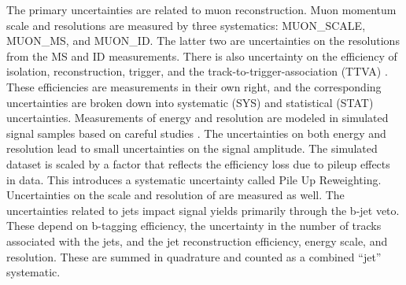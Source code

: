 The primary uncertainties are related to muon reconstruction.
Muon momentum scale and resolutions are measured by three systematics: MUON\_SCALE, MUON\_MS, and MUON\_ID. 
The latter two are uncertainties on the resolutions from the MS and ID measurements.
There is also uncertainty on the efficiency of isolation, reconstruction, trigger, and the track-to-trigger-association (TTVA) \cite{muonReco}.
These efficiencies are measurements in their own right, and the corresponding uncertainties are broken down into systematic (SYS) and statistical (STAT) uncertainties.
Measurements of energy and resolution are modeled in simulated signal samples based on careful studies \cite{elecReco}.
The uncertainties on both energy and resolution lead to small uncertainties on the signal amplitude.
The simulated dataset is scaled by a factor that reflects the efficiency loss due to pileup effects in data.
This introduces a systematic uncertainty called Pile Up Reweighting.
Uncertainties on the scale and resolution of \met are measured as well.
The uncertainties related to jets impact signal yields primarily through the b-jet veto.
These depend on b-tagging efficiency, the uncertainty in the number of tracks associated with the jets, and the jet reconstruction efficiency, energy scale, and resolution.
These are summed in quadrature and counted as a combined ``jet'' systematic.

